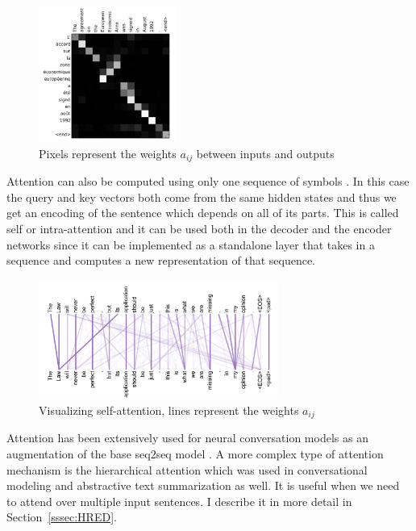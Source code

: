 \documentclass[12pt]{article}
\begin{document}
\begin{figure}[H]
	\label{fig:attentionb}
	\centering
	\includegraphics[width=0.4\textwidth]{pics/attn_weights.png}
	\caption{Pixels represent the weights \(a_{ij}\) between inputs and outputs \cite{Bahdanau:2014}}
\end{figure}
Attention can also be computed using only one sequence of symbols \cite{Cheng:2016,Lin:2017,Vaswani:2017}. In this case the query and key vectors both come from the same hidden states and thus we get an encoding of the sentence which depends on all of its parts. This is called self or intra-attention and it can be used both in the decoder and the encoder networks since it can be implemented as a standalone layer that takes in a sequence and computes a new representation of that sequence. 
\begin{figure}[H]
	\label{fig:attentionc}
	\centering
	\includegraphics[width=0.7\textwidth]{pics/self_attn.png}
	\caption{Visualizing self-attention, lines represent the weights \(a_{ij}\) \cite{Vaswani:2017}}
\end{figure}

Attention has been extensively used for neural conversation models as an augmentation of the base seq2seq model \cite{Yao:2016,Shang:2015,Xing_topic:2017,Zhao:2017}. A more complex type of attention mechanism is the hierarchical attention which was used in conversational modeling \cite{Xing:2017} and abstractive text summarization \cite{Nallapati:2016} as well. It is useful when we need to attend over multiple input sentences. I describe it in more detail in Section~\ref{sssec:HRED}.
\end{document}
